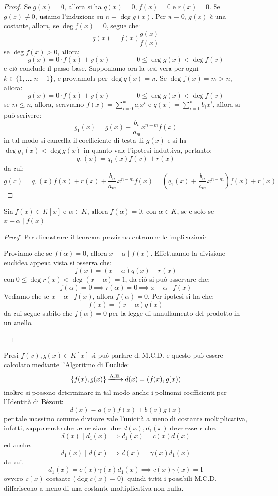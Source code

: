 \documentclass[11pt]{scrartcl}
\begin{document}
\begin{proof}
Se $g(x) = 0$, allora si ha $q(x) = 0$, $f(x) = 0$ e $r(x) = 0$. Se $g(x) \ne 0$, usiamo l'induzione su $n = \deg g(x)$. Per $n = 0$, $g(x)$ è una costante, allora, se $\deg f(x) = 0$, segue che:
	\[ g(x) = f(x) \frac{g(x)}{f(x)}
	\]
se $\deg f(x) >0$, allora:
	\[ g(x) = 0 \cdot f(x) + g(x)
	\qquad
	\qquad
	0 \leq\deg g(x) < \deg f(x)
	\]
e ciò conclude il passo base. Supponiamo ora la tesi vera per ogni $k \in \{1,\ldots,n-1\}$, e proviamola per $\deg g(x) = n$. Se $\deg f(x) = m > n$, allora:
	\[ g(x) =  0 \cdot f(x) + g(x)
	\qquad
	\qquad
	0 \leq\deg g(x) < \deg f(x)
	\]
se $m \leq n$, allora, scriviamo $f(x) = \sum_{i = 0}^{m}a_ix^i$ e $g(x) = \sum_{i = 0}^{n}b_ix^i$, allora si può scrivere:
	\[ g_1(x) = g(x) - \frac{b_n}{a_m}x^{n-m}f(x)
	\]
in tal modo si cancella il coefficiente di testa di $g(x)$ e si ha $\deg g_1(x) < \deg g(x)$ in quanto vale l'ipotesi induttiva, pertanto:
	\[  g_1(x) =  q_1(x)f(x)+ r(x)
	\]
 da cui:
 	\[ g(x) =  q_1(x)f(x)+ r(x) + \frac{b_n}{a_m}x^{n-m}f(x) = \left(q_1(x) + \frac{b_n}{a_m}x^{n-m}\right)f(x)+  r(x)
 	\]
\end{proof}

\begin{theorem}
\label{p:ruffini}
Sia $f(x) \in K[x]$ e $\alpha \in K$, allora $f(\alpha) = 0$, con $\alpha \in K$, se e solo se $x-\alpha \mid f(x)$.
\end{theorem}

\begin{proof}
Per dimostrare il teorema proviamo entrambe le implicazioni:
	\begin{itemize}
	\ii Proviamo che se $f(\alpha) = 0$, allora $x - \alpha \mid f(x)$. Effettuando la divisione euclidea appena vista si osserva che:
		\[ f(x)  = (x - \alpha)q(x) + r(x)
		\]
		con $0 \leq \deg r(x) < \deg (x-\alpha) = 1$, da ciò si può osservare che:
		\[ f(\alpha) = 0 \implies r(\alpha) = 0 \implies x - \alpha \mid f(x)
		\]
	\ii Vediamo che se $x-\alpha \mid f(x)$, allora $f(\alpha)=0$. Per ipotesi si ha che:
		\[ f(x) = (x - \alpha)q(x)
		\]
		da cui segue subito che $f(\alpha) = 0$ per la legge di annullamento del prodotto in un anello.
	\end{itemize}
\end{proof}


Presi $f(x), g(x) \in K[x]$ si può parlare di M.C.D. e questo può essere calcolato mediante l'Algoritmo di Euclide:
	\[ \{f(x),g(x)\} \xlongrightarrow{\text{A.E.}} d(x) = (f(x), g(x))
	\]
inoltre si possono determinare in tal modo anche i polinomi coefficienti per l'Identità di Bézout:
	\[ d(x) = a(x)f(x) + b(x)g(x)
	\]
per tale massimo comune divisore vale l'unicità a meno di costante moltiplicativa, infatti, supponendo che ve ne siano due $d(x),d_1(x)$ deve essere che:
	\[ d(x) \mid d_1(x) \implies d_1(x) = c(x)d(x)
	\]
ed anche:
	\[ d_1(x) \mid d(x) \implies d(x) = \gamma(x)d_1(x)
	\]
da cui:
	\[ d_1(x) = c(x) \gamma(x)d_1(x) \implies  c(x) \gamma(x) = 1
	\]
ovvero $c(x)$ costante ($\deg c(x) = 0$), quindi tutti i possibili M.C.D. differiscono a meno di una costante moltiplicativa non nulla.
\end{document}

